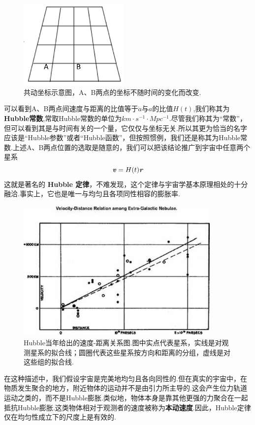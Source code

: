 \documentclass[a4paper]{book}
\newcommand{\xtjc}[1]{\textbf{\textit{#1}}}
\begin{document}
\begin{figure}[!h]
	\centering
	\includegraphics[width=5.36cm,height=4.4cm]{figures/坐标.eps}
	\caption{共动坐标示意图，A、B两点的坐标不随时间的变化而改变.}
\end{figure} 
可以看到A、B两点间速度与距离的比值等于$\dot{a}$与$a$的比值$H(t)$,我们称其为\textbf{Hubble常数},常取Hubble常数的单位为$km\cdot s^{-1}\cdot Mpc^{-1}$.尽管我们称其为“常数”，但可以看到其是与时间有关的一个量，它仅仅与坐标无关.所以其更为恰当的名字应该是“Hubble参数”或者“Hubble函数”，但按照惯例，我们还是称其为Hubble常数.上述A、B两点位置的选取是随意的，我们可以把该结论推广到宇宙中任意两个星系
\begin{equation}\label{1.4}
	\xtjc{v}=H(t)\xtjc{r}
\end{equation}
这就是著名的 \textbf{Hubble 定律}，不难发现，这个定律与宇宙学基本原理相处的十分融洽.事实上，它也是唯一与均匀且各项同性相容的膨胀率.\par 
\begin{figure}[!h]
	\centering
	\includegraphics[width=10cm,height=7cm]{figures/观测.eps}
	\caption{Hubble当年给出的速度-距离关系图.图中实点代表星系，实线是对观测星系的拟合线；圆圈代表这些星系按方向和距离的分组，虚线是对这些组的拟合线.}
\end{figure}
在这种描述中，我们假设宇宙是完美地均匀且各向同性的.但在真实的宇宙中，在物质发生聚合的地方，附近物体的运动并不是由引力所主导的.这会产生位力轨道运动之类的，而不是Hubble膨胀.类似地，物体本身是靠其他更强的力聚合在一起抵抗Hubble膨胀.这类物体相对于观测者的速度被称为\textbf{本动速度}.因此，Hubble定律仅在均匀性成立下的尺度上是有效的.\par 
\end{document}
